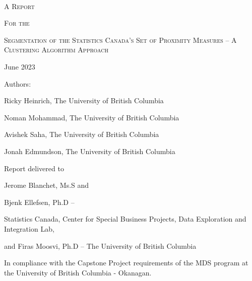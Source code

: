 \documentclass[11pt, a4paper]{article}
\newcommand{\comment}[1]{}
\begin{document}
\begin{center}
$ $

\vspace{2 pc}
\textsc{A Report} \par
\small{\textsc{For the}} \par
\Large{\textsc{Segmentation of the Statistics Canada’s Set of Proximity Measures – A
Clustering Algorithm Approach}}
\par
\vspace{0.917 pc} %
\par
\normalsize{ }

\thispagestyle{firststyle}


\vspace{8 pc} %


\par
June 2023
\par
\vspace{10pc}

\begin{small}
Authors: \par
Ricky Heinrich, The University of British Columbia \par
Noman Mohammad, The University of British Columbia \par
Avishek Saha, The University of British Columbia \par
Jonah Edmundson, The University of British Columbia
\end{small}


\par
\vfill
\par
\begin{footnotesize}
Report delivered to \par
Jerome Blanchet, Ms.S and \par
Bjenk Ellefsen, Ph.D – \par
Statistics Canada, Center for Special Business Projects, Data Exploration and Integration Lab, \par and
Firas Moosvi, Ph.D – The University of British Columbia
\end{footnotesize}

\comment{
\noindent\small{Statistics Canada Liaison - Jérôme Blanchet, Bjenk Ellefsen}
\par
\noindent\small{UBCO Project Supervisor - His Excellency Dr. Firas Moosvi}
}
\par
\vspace{2pc}
\par
\noindent\tiny{In compliance with the Capstone Project requirements of the MDS program at the University of British Columbia - Okanagan.}
\end{center}
\normalsize
\end{document}
